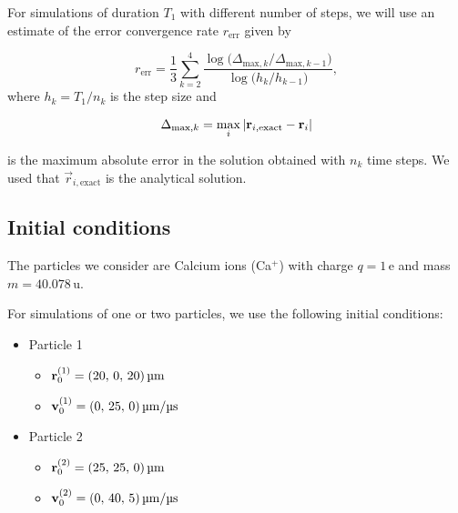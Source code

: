 For simulations of duration $T_1$ with different number of steps, we will use an estimate of the error convergence rate $r_\mathrm{err}$ given by

\begin{equation}\label{eq:error_convergence_rate}
    r_\mathrm{err} = \frac{1}{3} \sum_{k=2}^{4} \frac{\log{\big(\Delta_{\mathrm{max}, k} /\Delta_{\mathrm{max}, k-1}\big)}}{\log{\big(h_k/h_{k-1} \big)}},
\end{equation}
where $h_k =T_1/n_k$ is the step size and

\begin{equation}\label{eq:abs_error}
    \Delta_{\mathrm{max}, k} = \max_{i}\abs{\mathbf{r}_{i, \mathrm{exact}} - \mathbf{r}_i}
\end{equation}

is the maximum absolute error in the solution obtained with $n_k$ time steps. We used that $\vec{r}_{i, \mathrm{exact}}$ is the analytical solution.

\subsection{Initial conditions}\label{sec:initial_conditions}

The particles we consider are Calcium ions (Ca$^+$) with charge $q=1 \,\mathrm{e}$ and mass $m = 40.078 \,\mathrm{u}$. 

For simulations of one or two particles, we use the following initial conditions:
\begin{itemize}
    \item Particle 1\label{item:initial_conditions_p1}
    \begin{itemize}
        \item[] $\vec{r}^{(1)}_0 = (20, \,0, \,20) \, \mathrm{\text{\textmu}m} $
        \item[] $\vec{v}^{(1)}_0 = (0,\,25,\,0) \, \mathrm{\text{\textmu}m}/ \mathrm{\text{\textmu}s}$
    \end{itemize}
    \item Particle 2\label{item:initial_conditions_p2}
    \begin{itemize}
        \item[] $\vec{r}^{(2)}_0 = (25, \,25, \,0) \, \mathrm{\text{\textmu}m} $
        \item[] $\vec{v}^{(2)}_0 = (0,\,40,\,5) \, \mathrm{\text{\textmu}m}/ \mathrm{\text{\textmu}s}$
    \end{itemize}
\end{itemize}

